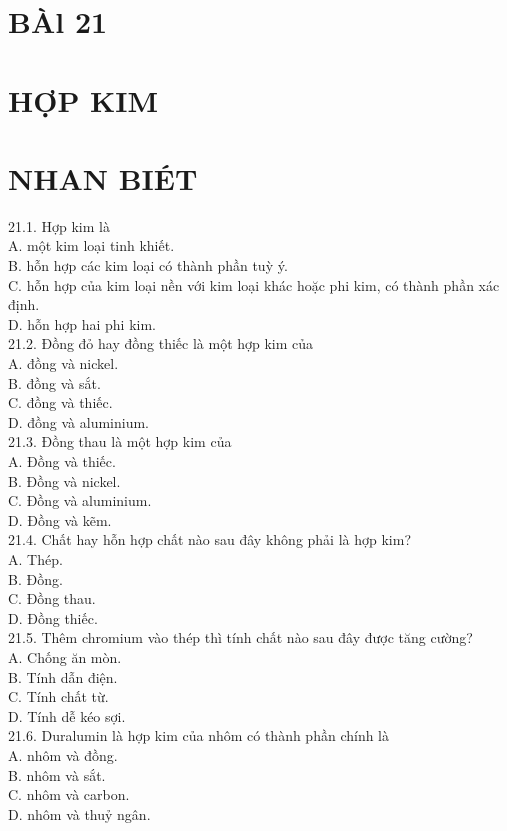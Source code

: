 \documentclass[10pt]{article}
\begin{document}
\section*{BÀl 21}
\section*{HỢP KIM}
\section*{NHAN BIÉT}
21.1. Hợp kim là\\
A. một kim loại tinh khiết.\\
B. hỗn hợp các kim loại có thành phần tuỳ ý.\\
C. hỗn hợp của kim loại nền với kim loại khác hoặc phi kim, có thành phần xác định.\\
D. hỗn hợp hai phi kim.\\
21.2. Đồng đỏ hay đồng thiếc là một hợp kim của\\
A. đồng và nickel.\\
B. đồng và sắt.\\
C. đồng và thiếc.\\
D. đồng và aluminium.\\
21.3. Đồng thau là một hợp kim của\\
A. Đồng và thiếc.\\
B. Đồng và nickel.\\
C. Đồng và aluminium.\\
D. Đồng và kẽm.\\
21.4. Chất hay hỗn hợp chất nào sau đây không phải là hợp kim?\\
A. Thép.\\
B. Đồng.\\
C. Đồng thau.\\
D. Đồng thiếc.\\
21.5. Thêm chromium vào thép thì tính chất nào sau đây được tăng cường?\\
A. Chống ăn mòn.\\
B. Tính dẫn điện.\\
C. Tính chất từ.\\
D. Tính dễ kéo sợi.\\
21.6. Duralumin là hợp kim của nhôm có thành phần chính là\\
A. nhôm và đồng.\\
B. nhôm và sắt.\\
C. nhôm và carbon.\\
D. nhôm và thuỷ ngân.
\end{document}
